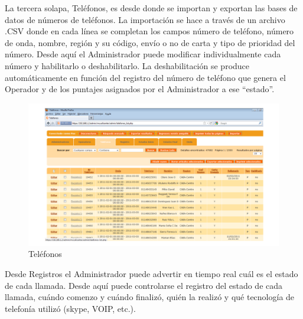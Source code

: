 \documentclass[
  openany]{book}
\begin{document}
La tercera solapa, Teléfonos, es desde donde se importan y exportan las bases de datos de números de teléfonos. La importación se hace a través de un archivo .CSV donde en cada línea se completan los campos número de teléfono, número de onda, nombre, región y su código, envío o no de carta y tipo de prioridad del número. Desde aquí el Administrador puede modificar individualmente cada número y habilitarlo o deshabilitarlo. La deshabilitación se produce automáticamente en función del registro del número de teléfono que genera el Operador y de los puntajes asignados por el Administrador a ese ``estado''.

\begin{figure}

{\centering \includegraphics[width=1\linewidth]{imagenes/figura6-05} 

}

\caption{Teléfonos}\label{fig:Tel}
\end{figure}

Desde Registros el Administrador puede advertir en tiempo real cuál es el estado de cada llamada. Desde aquí puede controlarse el registro del estado de cada llamada, cuándo comenzo y cuándo finalizó, quién la realizó y qué tecnología de telefonía utilizó (skype, VOIP, etc.).
\end{document}
